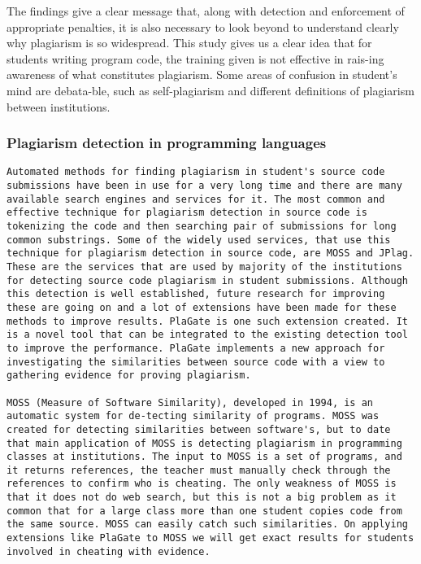 \documentclass[a4paper]{article}
\begin{document}
The findings give a clear message that, along with detection and
enforcement of appropriate penalties, it is also necessary to look
beyond to understand clearly why plagiarism is so widespread. This study
gives us a clear idea that for students writing program code, the
training given is not effective in rais-ing awareness of what
constitutes plagiarism. Some areas of confusion in student's mind are
debata-ble, such as self-plagiarism and different definitions of
plagiarism between institutions.

\subsubsection{Plagiarism detection in programming
languages}\label{plagiarism-detection-in-programming-languages}

\begin{verbatim}
Automated methods for finding plagiarism in student's source code submissions have been in use for a very long time and there are many available search engines and services for it. The most common and effective technique for plagiarism detection in source code is tokenizing the code and then searching pair of submissions for long common substrings. Some of the widely used services, that use this technique for plagiarism detection in source code, are MOSS and JPlag. These are the services that are used by majority of the institutions for detecting source code plagiarism in student submissions. Although this detection is well established, future research for improving these are going on and a lot of extensions have been made for these methods to improve results. PlaGate is one such extension created. It is a novel tool that can be integrated to the existing detection tool to improve the performance. PlaGate implements a new approach for investigating the similarities between source code with a view to gathering evidence for proving plagiarism.

MOSS (Measure of Software Similarity), developed in 1994, is an automatic system for de-tecting similarity of programs. MOSS was created for detecting similarities between software's, but to date that main application of MOSS is detecting plagiarism in programming classes at institutions. The input to MOSS is a set of programs, and it returns references, the teacher must manually check through the references to confirm who is cheating. The only weakness of MOSS is that it does not do web search, but this is not a big problem as it common that for a large class more than one student copies code from the same source. MOSS can easily catch such similarities. On applying extensions like PlaGate to MOSS we will get exact results for students involved in cheating with evidence. 


\end{verbatim}
\end{document}
